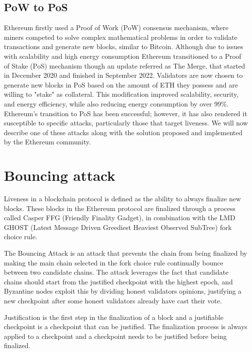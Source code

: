 \subsection{PoW to PoS}\label{sub:pow_to_pos}

Ethereum firstly used a Proof of Work (PoW) consensus mechanism, where miners competed to solve complex mathematical problems
in order to validate transactions and generate new blocks, similar to Bitcoin.
Although due to issues with scalability and high energy consumption Ethereum transitioned to a Proof of Stake (PoS) mechanism though an update
referred as The Merge, that started in December 2020 and finished in September 2022.
Validators are now chosen to generate new blocks in PoS based on the amount of ETH they possess and are willing to "stake" as collateral.
This modification improved scalability, security, and energy efficiency, while also reducing energy consumption by over 99\%.
Ethereum's transition to PoS has been successful; however, it has also rendered it susceptible to specific attacks, particularly those that target liveness.
We will now describe one of these attacks along with the solution proposed and implemented by the Ethereum community.

\section{Bouncing attack}\label{sub:bouncing_attack}

Liveness in a blockchain protocol is defined as the ability to always finalize new blocks. These blocks in the
Ethereum protocol are finalized through a process called Casper FFG (Friendly Finality Gadget), in combination with
the LMD GHOST (Latest Message Driven Greediest Heaviest Observed SubTree) fork choice rule.

The Bouncing Attack is an attack that prevents the chain from being finalized by making the main chain
selected in the fork choice rule continually bounce between two candidate chains. The attack leverages the fact that
candidate chains should start from the justified checkpoint with the highest epoch, and Byzantine nodes exploit this by
dividing honest validators opinions, justifying a new checkpoint after some honest validators already have cast their vote.

Justification is the first step in the finalization of a block and a justifiable checkpoint is a checkpoint that can be justified.
The finalization process is always applied to a checkpoint and a checkpoint needs to be justified before being finalized.

